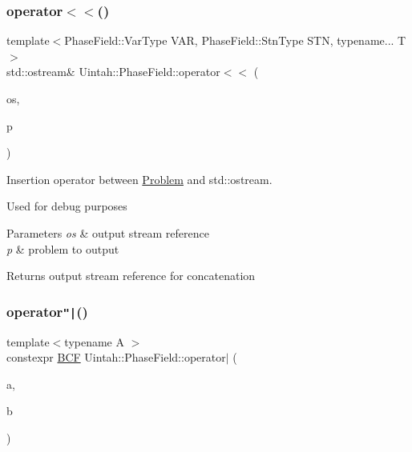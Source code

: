 \subsubsection{\texorpdfstring{operator$<$$<$()}{operator<<()}\hspace{0.1cm}{\footnotesize\ttfamily [2/2]}}
{\footnotesize\ttfamily template$<$Phase\+Field\+::\+Var\+Type V\+AR, Phase\+Field\+::\+Stn\+Type S\+TN, typename... T$>$ \\
std\+::ostream\& Uintah\+::\+Phase\+Field\+::operator$<$$<$ (\begin{DoxyParamCaption}\item[{std\+::ostream \&}]{os,  }\item[{const \hyperlink{classUintah_1_1PhaseField_1_1Problem}{Phase\+Field\+::\+Problem}$<$ V\+AR, S\+TN, T... $>$ \&}]{p }\end{DoxyParamCaption})}



Insertion operator between \hyperlink{classUintah_1_1PhaseField_1_1Problem}{Problem} and std\+::ostream. 

Used for debug purposes


\begin{DoxyParams}{Parameters}
{\em os} & output stream reference \\
\hline
{\em p} & problem to output \\
\hline
\end{DoxyParams}
\begin{DoxyReturn}{Returns}
output stream reference for concatenation 
\end{DoxyReturn}
\mbox{\label{namespaceUintah_1_1PhaseField_acafefaa50f1ec411fdb981feac59c488}} 
\subsubsection{\texorpdfstring{operator\texttt{"|}()}{operator|()}\hspace{0.1cm}{\footnotesize\ttfamily [1/3]}}
{\footnotesize\ttfamily template$<$typename A $>$ \\
constexpr \hyperlink{namespaceUintah_1_1PhaseField_ab9b5949afaa59b9b862e606410431331}{B\+CF} Uintah\+::\+Phase\+Field\+::operator$\vert$ (\begin{DoxyParamCaption}\item[{A}]{a,  }\item[{\hyperlink{namespaceUintah_1_1PhaseField_aeb51fe956fe07f1487f5878f4039f27c}{FC}}]{b }\end{DoxyParamCaption})}

